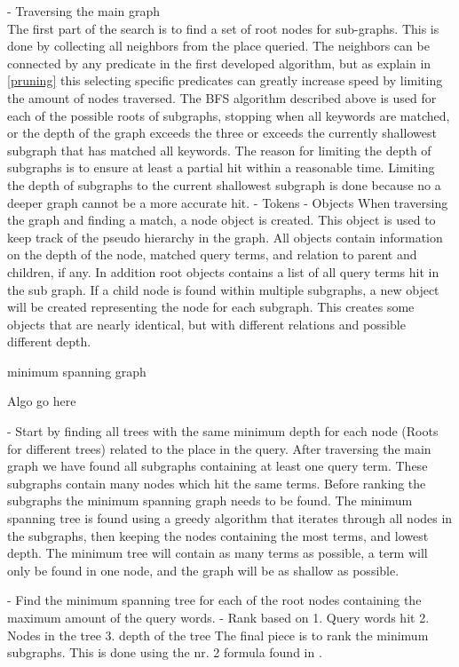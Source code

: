 - Traversing the main graph\\
The first part of the search is to find a set of root nodes for sub-graphs. This is done by collecting all neighbors from the place queried. The neighbors can be connected by any predicate in the first developed algorithm, but as explain in \ref{pruning} this selecting specific predicates can greatly increase speed by limiting the amount of nodes traversed. The BFS algorithm described above is used for each of the possible roots of subgraphs, stopping when all keywords are matched, or the depth of the graph exceeds the three or exceeds the currently shallowest subgraph that has matched all keywords. The reason for limiting the depth of subgraphs is to ensure at least a partial hit within a reasonable time. Limiting the depth of subgraphs to the current shallowest subgraph is done because no a deeper graph cannot be a more accurate hit.
- Tokens
- Objects
When traversing the graph and finding a match, a node object is created. This object is used to keep track of the pseudo hierarchy in the graph. All objects contain information on the depth of the node, matched query terms, and relation to parent and children, if any. In addition root objects contains a list of all query terms hit in the sub graph. If a child node is found within multiple subgraphs, a new object will be created representing the node for each subgraph. This creates some objects that are nearly identical, but with different relations and possible different depth.

\begin{algorithm}
\caption{minimum spanning graph}
\begin{algorithmic}[1]
Algo go here
\EndProcedure
\end{algorithmic}
\end{algorithm}

- Start by finding all trees with the same  minimum depth for each node (Roots for different trees) related to the place in the query.
After traversing the main graph we have found all subgraphs containing at least one query term. These subgraphs contain many nodes which hit the same terms. Before ranking the subgraphs the minimum spanning graph needs to be found. The minimum spanning tree is found using a greedy algorithm that iterates through all nodes in the subgraphs, then keeping the nodes containing the most terms, and lowest depth. The minimum tree will contain as many terms as possible, a term will only be found in one node, and the graph will be as shallow as possible.

- Find the minimum spanning tree for each of the root nodes containing the maximum amount of the query words.
- Rank based on 1. Query words hit 2. Nodes in the tree 3. depth of the tree
The final piece is to rank the minimum subgraphs. This is done using the nr. 2 formula found in \cite{Shi:2016:TRS:2882903.2882941}. 

\clearpage